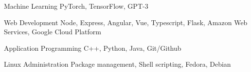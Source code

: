 
\begin{cvskills}
  \cvskill
  {Machine Learning}
  {PyTorch, TensorFlow, GPT-3}
  
  \cvskill
  	{Web Development}
  	{Node, Express, Angular, Vue, Typescript, Flask, Amazon Web Services, Google Cloud Platform}
  
  \cvskill
  	{Application Programming}
  	{C++, Python, Java, Git/Github}
  	
  \cvskill
  	{Linux Administration}
  	{Package management, Shell scripting, Fedora, Debian}
\end{cvskills}

